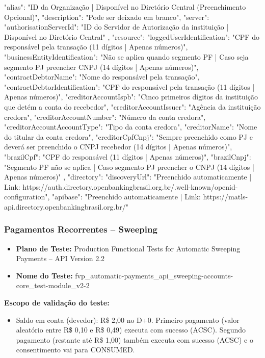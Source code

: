 \begin{codeblock}
{
    "alias": "ID da Organização | Disponível no Diretório Central (Preenchimento Opcional)",
    "description": "Pode ser deixado em branco",
    "server": {
        "authorisationServerId": "ID do Servidor de Autorização da instituição | Disponível no Diretório Central"
    },
    "resource": {
        "loggedUserIdentification": "CPF do responsável pela transação (11 dígitos | Apenas números)",
        "businessEntityIdentification": "Não se aplica quando segmento PF | Caso seja segmento PJ preencher CNPJ (14 dígitos | Apenas números)",
        "contractDebtorName": "Nome do responsável pela transação",
        "contractDebtorIdentification": "CPF do responsável pela transação (11 dígitos | Apenas números)",
        "creditorAccountIspb": "Cinco primeiros dígitos da instituição que detém a conta do recebedor",
        "creditorAccountIssuer": "Agência da instituição credora",
        "creditorAccountNumber": "Número da conta credora",
        "creditorAccountAccountType": "Tipo da conta credora",
        "creditorName": "Nome do titular da conta credora",
        "creditorCpfCnpj": "Sempre preenchido como PJ e deverá ser preenchido o CNPJ recebedor (14 dígitos | Apenas números)",
        "brazilCpf": "CPF do responsável (11 dígitos | Apenas números)",
        "brazilCnpj": "Segmento PF não se aplica | Caso segmento PJ preencher o CNPJ (14 dígitos | Apenas números)"
    },
    "directory": {
        "discoveryUrl": "Preenchido automaticamente | Link: https://auth.directory.openbankingbrasil.org.br/.well-known/openid-configuration",
        "apibase": "Preenchido automaticamente | Link: https://matls-api.directory.openbankingbrasil.org.br/"
    }
}
\end{codeblock}

\subsubsection{Pagamentos Recorrentes – Sweeping}
\begin{itemize}
    \item \textbf{Plano de Teste:} Production Functional Tests for Automatic Sweeping Payments – API Version 2.2
    \item \textbf{Nome do Teste:} fvp\_automatic-payments\_api\_sweeping-accounts-core\_test-module\_v2-2
\end{itemize}

\textbf{Escopo de validação do teste:}
\begin{itemize}
    \item Saldo em conta (devedor): R\$ 2,00 no D+0. Primeiro pagamento (valor aleatório entre R\$ 0,10 e R\$ 0,49) executa com sucesso (ACSC). Segundo pagamento (restante até R\$ 1,00) também executa com sucesso (ACSC) e o consentimento vai para CONSUMED.
\end{itemize}

